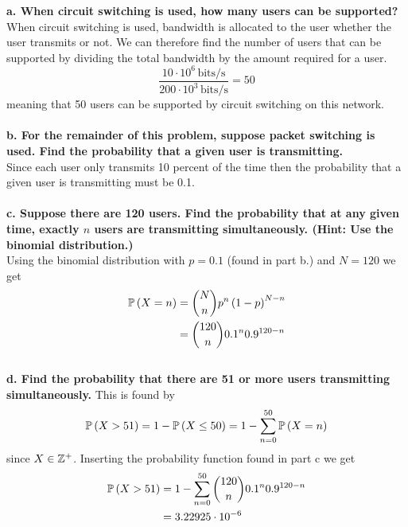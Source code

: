 \textbf{a. When circuit switching is used, how many users can be supported?} \\
When circuit switching is used, bandwidth is allocated to the user whether the user transmits or not. We can therefore find the number of users that can be supported by dividing the total bandwidth by the amount required for a user.
\begin{equation*}
    \frac{10 \cdot 10^6 \, \text{bits/s}}{200 \cdot 10^3 \, \text{bits/s}} = 50
\end{equation*}
meaning that 50 users can be supported by circuit switching on this network.\\
\\
\textbf{b. For the remainder of this problem, suppose packet switching is used. Find the probability that a given user is transmitting.} \\
Since each user only transmits 10 percent of the time then the probability that a given user is transmitting must be 0.1. \\
\\
\textbf{c. Suppose there are 120 users. Find the probability that at any given time, exactly $n$ users are transmitting simultaneously. (Hint: Use the binomial distribution.)} \\
Using the binomial distribution with $p = 0.1$ (found in part b.) and $N = 120$ we get
\begin{equation*}
\begin{split}
    \P\lr{X = n} &= \binom{N}{n} p^n \lr{1 - p}^{N - n} \\
    &= \binom{120}{n} 0.1^n 0.9^{120 - n}
\end{split}
\end{equation*}
\\
\textbf{d. Find the probability that there are 51 or more users transmitting simultaneously.}
This is found by
\begin{equation*}
    \P \lr{X > 51} = 1 - \P \lr{X \leq 50}  = 1 - \sum_{n = 0}^{50} \P\lr{X = n}
\end{equation*}
since $X \in \mathbb Z^+$. Inserting the probability function found in part c we get
\begin{equation*}
\begin{split}
    \P \lr{X > 51} &= 1 - \sum_{n = 0}^{50} \binom{120}{n} 0.1^n 0.9^{120 - n} \\
    &= 3.22925 \cdot 10^{-6}
\end{split}
\end{equation*}

